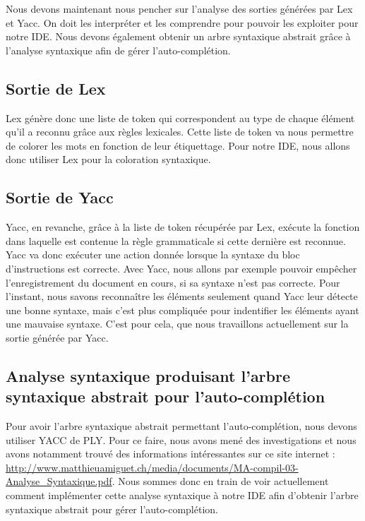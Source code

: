 \documentclass[a4paper,12pt]{article}
\begin{document}
	Nous devons maintenant nous pencher sur l'analyse des sorties générées par Lex et Yacc. On doit les interpréter et les comprendre pour pouvoir les exploiter pour notre IDE. Nous devons également obtenir un arbre syntaxique abstrait grâce à l'analyse syntaxique afin de gérer l'auto-complétion.


	\subsection{Sortie de Lex}

		Lex génère donc une liste de token qui correspondent au type de chaque élément qu'il a reconnu grâce aux règles lexicales. Cette liste de token va nous permettre de colorer les mots en fonction de leur étiquettage. Pour notre IDE, nous allons donc utiliser Lex pour la coloration syntaxique. 
	
	\subsection{Sortie de Yacc}

		Yacc, en revanche, grâce à la liste de token récupérée par Lex, exécute la fonction dans laquelle est contenue la règle grammaticale si cette dernière est reconnue. Yacc va donc exécuter une action donnée lorsque la syntaxe du bloc d'instructions est correcte. Avec Yacc, nous allons par exemple pouvoir empêcher l'enregistrement du document en cours, si sa syntaxe n'est pas correcte.
		Pour l'instant, nous savons reconnaître les éléments seulement quand Yacc leur détecte une bonne syntaxe, mais c'est plus compliquée pour indentifier les éléments ayant une mauvaise syntaxe. C'est pour cela, que nous travaillons actuellement sur la sortie générée par Yacc. 
		
	\subsection{Analyse syntaxique produisant l'arbre syntaxique abstrait pour l'auto-complétion}

		Pour avoir l'arbre syntaxique abstrait permettant l'auto-complétion, nous devons utiliser YACC de PLY. Pour ce faire, nous avons mené des investigations et nous avons notamment trouvé des informations intéressantes sur ce site internet : \\\url{http://www.matthieuamiguet.ch/media/documents/MA-compil-03-Analyse_Syntaxique.pdf}. Nous sommes donc en train de voir actuellement comment implémenter cette analyse syntaxique à notre IDE afin d'obtenir l'arbre syntaxique abstrait pour gérer l'auto-complétion.
			
\end{document}
